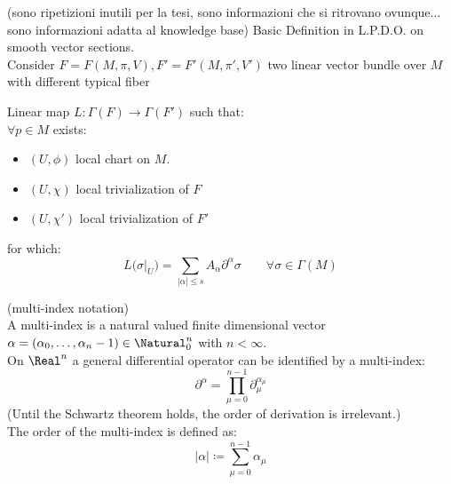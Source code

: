 \documentclass[Main]{subfiles}
\begin{document}
	(sono ripetizioni inutili per la tesi, sono informazioni che si ritrovano ovunque... sono informazioni adatta al knowledge base)
Basic Definition in L.P.D.O. on smooth vector sections.
\\
Consider $F=F(M,\pi,V), F'=F'(M,\pi',V')$ two linear vector bundle over $M$ with different typical fiber
	\begin{definition}
		Linear map $L:\Gamma(F)\rightarrow \Gamma(F')$ such that:
		\\
		$\forall p \in M$ exists:
		\begin{itemize}
			\item $(U, \phi)$ local chart on $M$.
			\item $(U, \chi)$ local trivialization of $F$
			\item $(U, \chi')$ local trivialization of $F'$
		\end{itemize}
		for which:
		\begin{displaymath}
			L \big(\sigma \big\vert_U\big) = \sum_{\vert \alpha \vert \leq s} A_\alpha \partial^\alpha \sigma \qquad \forall \sigma \in \Gamma(M)
		\end{displaymath}
	\end{definition}

	\begin{remark}
	(multi-index notation)
	\\
	A multi-index is a natural valued finite dimensional vector $\alpha = ( \alpha_0, \ldots, \alpha_n-1) \in \Natural^n_0$ with $n<\infty$.
	\\
	On $\Real^n$ a general differential operator can be identified by a multi-index:
	\begin{displaymath}
		\partial^\alpha = \prod_{\mu = 0}^{n-1} \partial_\mu ^{\alpha_\mu}
	\end{displaymath}
	(Until the Schwartz theorem holds, the order of derivation is irrelevant.)
	\\
	The order of the multi-index is defined as:
	\begin{displaymath}
		\vert \alpha \vert \coloneqq \sum_{\mu=0}^{n-1} \alpha_\mu
	\end{displaymath}
	\end{remark}
\end{document}
